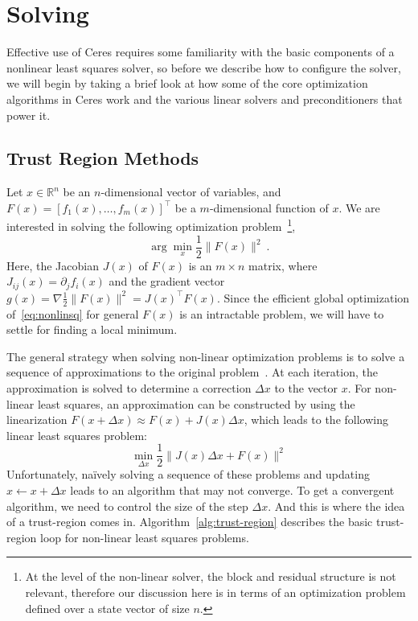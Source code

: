 \chapter{Solving}
Effective use of Ceres requires some familiarity with the basic components of a nonlinear least squares solver, so before we describe how to configure the solver, we will begin by taking a brief look at how some of the core optimization algorithms in Ceres work and the various linear solvers and preconditioners that power it.

\section{Trust Region Methods}
\label{sec:trust-region}
Let $x \in \mathbb{R}^{n}$ be an $n$-dimensional vector of variables, and
$ F(x) = \left[f_1(x),   \hdots,  f_{m}(x) \right]^{\top}$ be a $m$-dimensional function of $x$.  We are interested in solving the following optimization problem~\footnote{At the level of the non-linear solver, the block and residual structure is not relevant, therefore our discussion here is in terms of an optimization problem defined over a state vector of size $n$.},
\begin{equation}
        \arg \min_x \frac{1}{2}\|F(x)\|^2\ .
        \label{eq:nonlinsq}
\end{equation}
Here, the Jacobian $J(x)$ of $F(x)$ is an $m\times n$ matrix, where $J_{ij}(x) = \partial_j f_i(x)$  and the gradient vector $g(x) = \nabla  \frac{1}{2}\|F(x)\|^2 = J(x)^\top F(x)$. Since the efficient global optimization of~\eqref{eq:nonlinsq} for general $F(x)$ is an intractable problem, we will have to settle for finding a local minimum.

The general strategy when solving non-linear optimization problems is to solve a sequence of approximations to the original problem~\cite{nocedal2000numerical}. At each iteration, the approximation is solved to determine a correction $\Delta x$ to the vector $x$. For non-linear least squares, an approximation can be constructed by using the linearization $F(x+\Delta x) \approx F(x) + J(x)\Delta x$, which leads to the following linear least squares  problem:
\begin{equation}
         \min_{\Delta x} \frac{1}{2}\|J(x)\Delta x + F(x)\|^2
        \label{eq:linearapprox}
\end{equation}
Unfortunately, na\"ively solving a sequence of these problems and
updating $x \leftarrow x+ \Delta x$ leads to an algorithm that may not
converge.  To get a convergent algorithm, we need to control the size
of the step $\Delta x$. And this is where the idea of a trust-region
comes in. Algorithm~\ref{alg:trust-region} describes the basic  trust-region loop for non-linear least squares problems.

